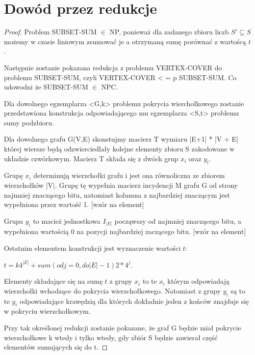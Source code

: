 \section{Dowód przez redukcje}
\begin{proof}
Problem SUBSET-SUM $\in$ NP, ponieważ dla zadanego zbioru liczb $S' \subseteq S$ możemy w czasie liniowym zsumować je a otrzymaną sumę porównać z wartoścą $t$.

Następnie zostanie pokazana redukcja z problemu VERTEX-COVER do problemu SUBSET-SUM, czyli VERTEX-COVER < = p SUBSET-SUM. Co udowodni że SUBSET-SUM $\in$ NPC. 

Dla dowolnego egzemplarza <G,k> problemu pokrycia wierchołkowego zostanie przedstawiona konstrukcja odpowiadającego mu egzemplarza <S,t> problemu sumy podzbioru. 

Dla dowolnego grafu G(V,E) skonstujmy macierz T wymiaru |E+1| * |V + E| której wiersze będą odzwierciedlały kolejne elementy zbioru S zakodowane w układzie czwórkowym. Macierz T składa się z dwóch grup $x_i$ oraz $y_i$.

Grupę $x_i$ determinują wierzchołki grafu i jest ona równoliczna ze zbiorem wierzchołków |V|. Grupę tę wypełnia macierz incydencji M grafu G od strony najmniej znaczącego bitu, natomiast kolumna z najbardziej znaczącym jest wypełniona przez wartość 1.
[wzór na element]

Grupa $y_i$ to macież jednostkowa $I_{|E|}$ począwszy od najmniej znaczącego bitu, a wypełniona wartością 0 na pozycji najbardziej zaczącego bitu.
[wzór na element]

Ostatnim elementem konstrukcji jest wyznaczenie wartości $t$:

 $ t = k4^{|E|} + sum (od j=0, do |E|-1) 2 * 4^j$. 

Elementy składające się na sumę $t$ z grupy $x_i$ to te $x_i$ którym odpowiadają wierzchołki wchodzące do pokrycia wierzchołkowego. Natomiast z grupy $y_i$ są to te $y_i$ odpowiadające krawędzią dla których dokładnie jeden z końców znajduje się w pokryciu wierzchołkowym.



Przy tak określonej redukcji zostanie pokazane, że graf G będzie miał pokrycie wierzchołkowe k wtedy i tylko wtedy, gdy zbiór S będzie zawierał część elementów sumujących się do t.


\end{proof}
